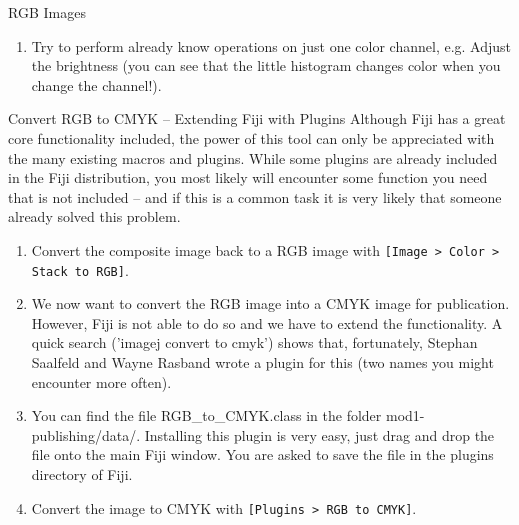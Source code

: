 \begin{taskbox}{RGB Images}
\begin{enumerate}
		\begin{minipage}[t]{\linewidth}
		\begin{center}
		\medskip
		\label{fig:channels-tool-dialog}
		\end{center}
	\end{minipage}
	
	\item Try to perform already know operations on just one color channel, e.g. Adjust the brightness (you can see that the little histogram changes color when you change the channel!).
\end{enumerate}

\end{taskbox}

\begin{taskbox}{Convert RGB to CMYK -- Extending Fiji with Plugins}
Although Fiji has a great core functionality included, the power of this tool can only be appreciated with the many existing macros and plugins. While some plugins are already included in the Fiji distribution, you most likely will encounter some function you need that is not included -- and if this is a common task it is very likely that someone already solved this problem. 

\begin{enumerate}
	\item Convert the composite image back to a RGB image with \texttt{[Image > Color > Stack to RGB]}.
	\item We now want to convert the RGB image into a CMYK image for publication. However, Fiji is not able to do so and we have to extend the functionality. A quick search ('imagej convert to cmyk') shows that, fortunately, Stephan Saalfeld and Wayne Rasband wrote a plugin for this (two names you might encounter more often).
	\item You can find the file RGB\_to\_CMYK.class in the folder mod1-publishing/data/. Installing this plugin is very easy, just drag and drop the file onto the main Fiji window. You are asked to save the file in the plugins directory of Fiji. 
	\item Convert the image to CMYK with \texttt{[Plugins > RGB to CMYK]}.
\end{enumerate}

\end{taskbox}

